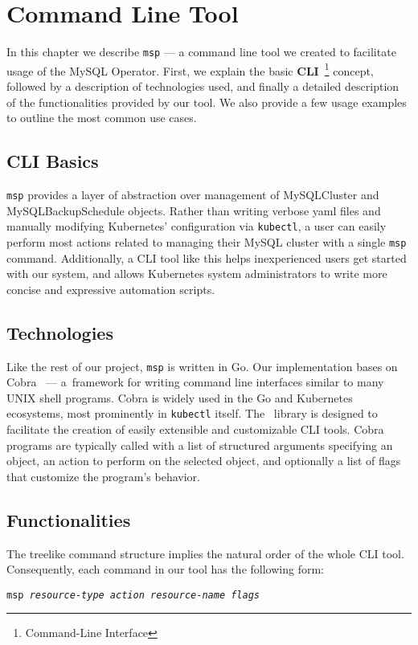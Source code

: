 \chapter{Command Line Tool}
In this chapter we describe \texttt{msp} --- a command line tool we created
to facilitate usage of the MySQL Operator. First, we explain the basic
\textbf{CLI}~\footnote{Command-Line Interface} concept, followed by a description
of technologies used, and finally a detailed description of the functionalities
provided by our tool. We also provide a few usage examples to outline the most
common use cases.

\section{CLI Basics}
\texttt{msp} provides a layer of abstraction over management of MySQLCluster
and MySQLBackupSchedule objects. Rather than writing verbose yaml files and manually
modifying Kubernetes' configuration via \texttt{kubectl}, a user can easily
perform most actions related to managing their MySQL cluster with a single
\texttt{msp} command. Additionally, a CLI tool like this helps inexperienced users
get started with our system, and allows Kubernetes system administrators to
write more concise and expressive automation scripts.

\section{Technologies}
Like the rest of our project, \texttt{msp} is written in Go. Our implementation
bases on Cobra~\cite{cobra} --- a~framework for writing command line interfaces
similar to many UNIX shell programs. Cobra is widely used in the Go and
Kubernetes ecosystems, most prominently in \texttt{kubectl} itself. The~ library
is designed to facilitate the creation of easily extensible and
customizable CLI tools. Cobra programs are typically called with a list
of structured arguments specifying an object, an action to perform on the
selected object, and optionally a list of flags that customize the program's
behavior.

\section{Functionalities}
The treelike command structure implies the natural order of the whole CLI
tool. Consequently, each command in our tool has the following form:

\vspace{.75em}
\centerline{\texttt{msp \textit{resource-type action resource-name flags}}}
\vspace{.75em}

